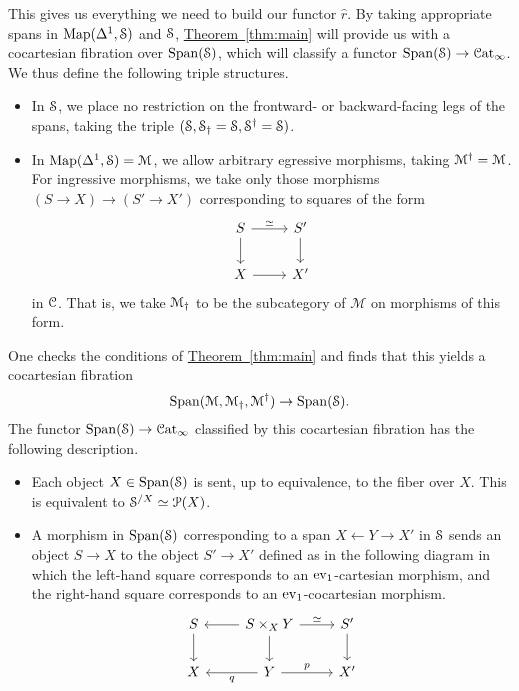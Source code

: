 \documentclass[main.tex]{subfiles}
\begin{document}
This gives us everything we need to build our functor $\hat{r}$. By taking appropriate spans in $\Map(\Delta^{1}, \S)$ and $\S$, \hyperref[thm:main]{Theorem~\ref*{thm:main}} will provide us with a cocartesian fibration over $\Span(\S)$, which will classify a functor $\Span(\S) \to \ICat$. We thus define the following triple structures.
\begin{itemize}
  \item In $\S$, we place no restriction on the frontward- or backward-facing legs of the spans, taking the triple $(\S, \S\downdag = \S, \S\updag = \S)$.

  \item In $\Map(\Delta^{1}, \S) = \mathcal{M}$, we allow arbitrary egressive morphisms, taking $\category{M}\updag = \category{M}$. For ingressive morphisms, we take only those morphisms $(S \to X) \to (S' \to X')$ corresponding to squares of the form
    \begin{equation*}
      \begin{tikzcd}
        S
        \arrow[r, "\simeq"]
        \arrow[d]
        & S'
        \arrow[d]
        \\
        X
        \arrow[r]
        & X'
      \end{tikzcd}
    \end{equation*}
    in $\category{C}$. That is, we take $\mathcal{M}\downdag$ to be the subcategory of $\mathcal{M}$ on morphisms of this form.
\end{itemize}

One checks the conditions of \hyperref[thm:main]{Theorem~\ref*{thm:main}} and finds that this yields a cocartesian fibration
\begin{equation*}
  \Span\triple{M} \to \Span(\S).
\end{equation*}
The functor $\Span(\S) \to \ICat$ classified by this cocartesian fibration has the following description.
\begin{itemize}
  \item Each object $X \in \Span(\S)$ is sent, up to equivalence, to the fiber over $X$. This is equivalent to $\S^{/X} \simeq \P(X)$.

  \item A morphism in $\Span(\S)$ corresponding to a span $X \leftarrow Y \rightarrow X'$ in $\S$ sends an object $S \to X$ to the object $S' \to X'$ defined as in the following diagram in which the left-hand square corresponds to an $\ev_{1}$-cartesian morphism, and the right-hand square corresponds to an $\ev_{1}$-cocartesian morphism.
    \begin{equation*}
      \begin{tikzcd}
        S
        \arrow[d]
        & S \times_{X} Y
        \arrow[l]
        \arrow[r, "\simeq"]
        \arrow[d]
        & S'
        \arrow[d]
        \\
        X
        & Y
        \arrow[l, "q"]
        \arrow[r, "p"]
        & X'
      \end{tikzcd}
    \end{equation*}
\end{itemize}
\end{document}
